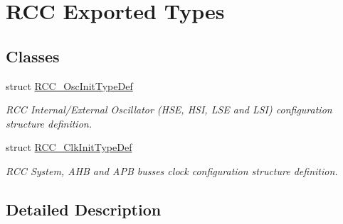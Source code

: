 \hypertarget{group___r_c_c___exported___types}{}\section{R\+CC Exported Types}
\label{group___r_c_c___exported___types}
\subsection*{Classes}
\begin{DoxyCompactItemize}
\item 
struct \mbox{\hyperlink{struct_r_c_c___osc_init_type_def}{R\+C\+C\+\_\+\+Osc\+Init\+Type\+Def}}
\begin{DoxyCompactList}\small\item\em R\+CC Internal/\+External Oscillator (H\+SE, H\+SI, L\+SE and L\+SI) configuration structure definition. \end{DoxyCompactList}\item 
struct \mbox{\hyperlink{struct_r_c_c___clk_init_type_def}{R\+C\+C\+\_\+\+Clk\+Init\+Type\+Def}}
\begin{DoxyCompactList}\small\item\em R\+CC System, A\+HB and A\+PB busses clock configuration structure definition. \end{DoxyCompactList}\end{DoxyCompactItemize}


\subsection{Detailed Description}
